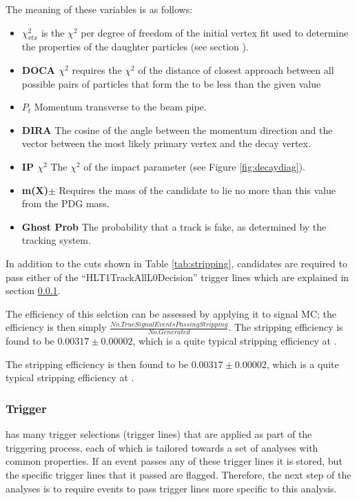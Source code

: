 The meaning of these variables is as follows:
\begin{itemize}
\item \textbf{$\chi_{vtx}^2$} is the $\chi^2$ per degree of freedom of the initial vertex fit used to determine the properties of the daughter particles (see section \label{sec:Decay Reconstruction}).
\item \textbf{DOCA $\chi^2$} requires the $\chi^2$ of the distance of closest approach between all possible pairs of particles that form the \Bd to be less than the given value
\item \textbf{$P_t$} Momentum transverse to the beam pipe.
\item \textbf{DIRA} The cosine of the angle between the \Bd momentum direction and the vector between the most likely primary vertex and the \Bd decay vertex.
\item \textbf{IP $\chi^2$} The $\chi^2$ of the impact parameter (see Figure \ref{fig:decaydiag}).
\item \textbf{m(X)$\pm$} Requires the mass of the candidate to lie no more than this value from the PDG mass.
\item \textbf{Ghost Prob} The probability that a track is fake, as determined by the \lhcb tracking system.
\end{itemize}
In addition to the cuts shown in Table \ref{tab:stripping}, candidates are required to pass either of the  ``HLT1TrackAllL0Decision'' trigger lines which are explained in section \ref{sec:trigger}.


The efficiency of this selction can be assessed by applying it to signal MC; the efficiency is then simply $\frac{No. True Signal Events Passing Stripping}{ No. Generated}$.  The stripping efficiency is found to be $0.00317 \pm 0.00002$, which is a quite typical stripping efficiency at \lhcb.

The stripping efficiency is then found to be $0.00317 \pm 0.00002$, which is a quite typical stripping efficiency at \lhcb.

\subsubsection{Trigger}
\label{sec:trigger}
\lhcb has many trigger selections (trigger lines) that are applied as part of the triggering process, each of which is tailored towards a set of analyses with common properties. If an event passes any of these trigger lines it is stored, but the specific trigger lines that it passed are flagged.  Therefore, the next step of the analyses is to require events to pass trigger lines more specific to this analysis.

